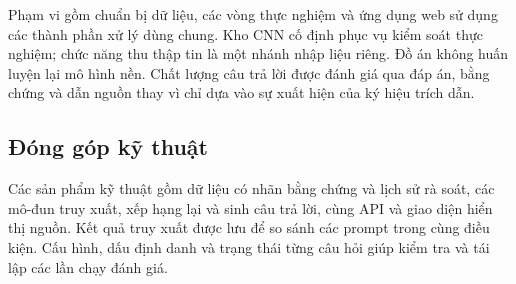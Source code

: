 Phạm vi gồm chuẩn bị dữ liệu, các vòng thực nghiệm và ứng dụng web sử dụng các thành phần xử lý dùng chung. Kho CNN cố định phục vụ kiểm soát thực nghiệm; chức năng thu thập tin là một nhánh nhập liệu riêng. Đồ án không huấn luyện lại mô hình nền. Chất lượng câu trả lời được đánh giá qua đáp án, bằng chứng và dẫn nguồn thay vì chỉ dựa vào sự xuất hiện của ký hiệu trích dẫn.
\subsection{Đóng góp kỹ thuật}
Các sản phẩm kỹ thuật gồm dữ liệu có nhãn bằng chứng và lịch sử rà soát, các mô-đun truy xuất, xếp hạng lại và sinh câu trả lời, cùng API và giao diện hiển thị nguồn. Kết quả truy xuất được lưu để so sánh các prompt trong cùng điều kiện. Cấu hình, dấu định danh và trạng thái từng câu hỏi giúp kiểm tra và tái lập các lần chạy đánh giá.
